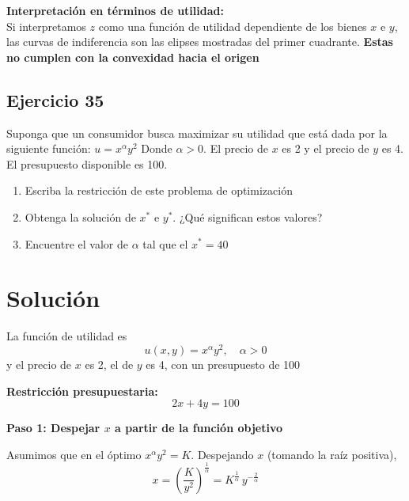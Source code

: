 \documentclass{article}
\begin{document}
        \noindent        
        \textbf{Interpretación en términos de utilidad:} \\
        Si interpretamos \(z\) como una función de utilidad dependiente de los bienes \(x\) e \(y\), las curvas de indiferencia son las elipses mostradas del primer cuadrante. \textbf{\color{teal}Estas no cumplen con la convexidad hacia el origen}




\newpage



\subsection{Ejercicio 35}

   Suponga que un consumidor busca maximizar su utilidad que está dada por la siguiente función: $u=x^\alpha y^2$
Donde $\alpha>0$. El precio de $x$ es 2 y el precio de $y$ es 4. El presupuesto disponible es 100.
\begin{enumerate}
    \item Escriba la restricción de este problema de optimización 
    \item Obtenga la solución de $x^*$ e $y^*$. ¿Qué significan estos valores?
    \item Encuentre el valor de $\alpha$ tal que el $x^*=40$
\end{enumerate}


\newpage
\section*{Solución}




        La función de utilidad es
        \[
        u(x,y)=x^\alpha y^2,\quad \alpha>0
        \]
        y el precio de \(x\) es 2, el de \(y\) es 4, con un presupuesto de 100  
        
        \bigskip
        
        \textbf{Restricción presupuestaria:}
        \[
        2x+4y=100
        \]
        
        \bigskip
    
    \textbf{Paso 1: Despejar \(x\) a partir de la función objetivo}
    
    Asumimos que en el óptimo \(x^\alpha y^2=K\). Despejando \(x\) (tomando la raíz positiva),
    \[
    x = \left(\frac{K}{y^2}\right)^{\frac{1}{\alpha}} = K^{\frac{1}{\alpha}}\,y^{-\frac{2}{\alpha}}
    \]
    
\end{document}
